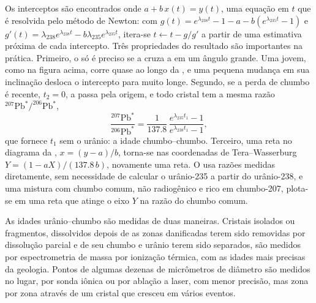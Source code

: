 
Os interceptos são encontrados onde $a + b\,x(t) = y(t)$, uma equação em $t$ que é
resolvida pelo método de Newton: com $g(t) = e^{\lambda_{238}t} - 1 - a -
b(e^{\lambda_{235}t} - 1)$ e $g'(t) = \lambda_{238}e^{\lambda_{238}t} -
b\lambda_{235}e^{\lambda_{235}t}$, itera-se $t \leftarrow t - g/g'$ a partir de uma estimativa
próxima de cada intercepto. Três propriedades do resultado são importantes na prática.
Primeiro, o  só é preciso se a  cruza a  em um ângulo
grande. Uma  jovem, como na figura acima, corre quase ao longo da ,
e uma pequena mudança em sua inclinação desloca o
intercepto para muito longe. Segundo, se a perda de chumbo é recente, $t_2 = 0$, a 
passa pela origem, e todo cristal tem a mesma
razão $^{207}\mathrm{Pb}^*/^{206}\mathrm{Pb}^*$,
\[
\frac{^{207}\mathrm{Pb}^*}{^{206}\mathrm{Pb}^*} = \frac{1}{137.8}\,
\frac{e^{\lambda_{235}t_1} - 1}{e^{\lambda_{238}t_1} - 1},
\]
que fornece $t_1$ sem o urânio: a idade chumbo--chumbo. Terceiro, uma reta no
diagrama da , $x = (y - a)/b$, torna-se nas
coordenadas de Tera--Wasserburg $Y = (1 - aX)/(137.8\,b)$, novamente uma reta. O
 usa razões medidas diretamente, sem necessidade de calcular o urânio-235
a partir do urânio-238, e uma mistura com chumbo comum, não radiogênico e rico em
chumbo-207, plota-se em uma reta que atinge o eixo $Y$ na razão do chumbo
comum.

As idades urânio--chumbo são medidas de duas maneiras. Cristais isolados ou fragmentos,
dissolvidos depois de as zonas danificadas terem sido removidas por dissolução parcial
e de seu chumbo e urânio terem sido separados, são medidos por espectrometria de massa
por ionização térmica, com as idades mais precisas da geologia. Pontos de algumas dezenas de
micrômetros de diâmetro são medidos no lugar, por sonda iônica ou por ablação a laser,
com menor precisão, mas zona por zona através de um cristal que cresceu em
vários eventos.

